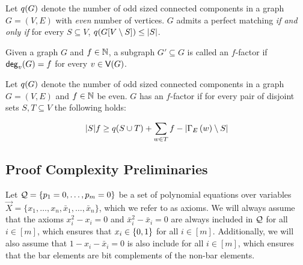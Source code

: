 \documentclass[11pt]{article}
\begin{document}
\begin{lemma}\label{lemma:tutte-criterion}
Let $q(G)$ denote the number of odd sized connected components in a graph $G=(V,E)$ with \emph{even} number of vertices.
$G$ admits a perfect matching \emph{if and only if} for every $S \subseteq V$, $q(G[V \setminus S]) \leq |S|$.
\end{lemma}

\begin{definition}[$f$-factor]\label{defn:f-factor}
  Given a graph $G$ and $f \in \mathbb{N}$, a subgraph $G' \subseteq G$ is called an $f$-factor if $\mathsf{deg}_{v}(G) = f$ for every $v \in \mathsf{V}(G)$.
\end{definition}


\begin{lemma}\label{lemma:tutte-criterion-factor}
  Let $q(G)$ denote the number of odd sized connected components in a graph $G=(V,E)$ and $f \in \mathbb{N}$ be even. $G$ has an $f$-factor if for every pair of disjoint sets $S, T \subseteq V$ the following holds:

  \[ |S|f \geq q(S \cup T) + \sum_{w \in T} f - |\Gamma_{E}\left(w\right) \setminus S| \]
\end{lemma}


\subsection{Proof Complexity Preliminaries}
\label{sec:proof-system-prelims}

Let $\mathcal{Q} = \{ p_1 = 0, \dots, p_m = 0\}$ be a set of polynomial equations over variables $\vec{X} = \{x_1, \dots, x_n, \bar{x}_1, \dots, \bar{x}_n\}$, which we refer to as axioms.
We will always assume that the axioms $x_i^2 - x_i = 0$ and $\bar{x}_i^2 - \bar{x}_i = 0$ are always included in $\mathcal{Q}$ for all $i \in [m]$, which ensures that $x_i \in \{0,1\}$ for all $i\in [m]$.
Additionally, we will also assume that $1 - x_i - \bar{x}_i=0$ is also include for all $i \in [m]$, which ensures that the bar elements are bit complements of the non-bar elements.
\end{document}
